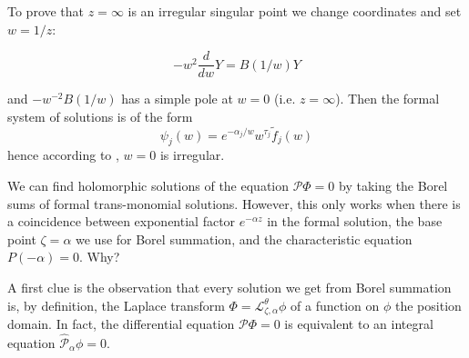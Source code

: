 \documentclass{article}
\newcommand{\laplace}{\mathcal{L}}
\theoremstyle{definition}
\theoremstyle{plain}
\newenvironment{verify}{\color{ForestGreen}}{\color{black}}
\begin{document}
\begin{verify}
To prove that $z=\infty$ is an irregular singular point we change coordinates and set $w=1/z$:  

 \begin{equation}
        -w^2 \frac{d}{dw}Y= B(1/w) Y 
    \end{equation}

and $-w^{-2}B(1/w)$ has a simple pole at $w=0$ (i.e. $z=\infty$). Then the formal system of solutions is of the form 
\[\psi_j(w)=e^{-\alpha_j/w} w^{\tau_j} \tilde{f}_j(w)\]
hence according to \cite[Definition 3.3.2]{diverg-resurg--ii}, $w=0$ is irregular.
\par
\end{verify}
We can find holomorphic solutions of the equation $\mathcal{P}\Phi = 0$ by taking the Borel sums of formal trans-monomial solutions. However, this only works when there is a coincidence between exponential factor $e^{-\alpha z}$ in the formal solution, the base point $\zeta = \alpha$ we use for Borel summation, and the characteristic equation $P(-\alpha) = 0$. Why?

A first clue is the observation that every solution we get from Borel summation is, by definition, the Laplace transform $\Phi = \laplace_{\zeta,\alpha}^\theta \phi$ of a function on $\phi$ the position domain. In fact, the differential equation $\mathcal{P}\Phi = 0$ is equivalent to an integral equation $\hat{\mathcal{P}}_\alpha \phi = 0$.
\end{document}
